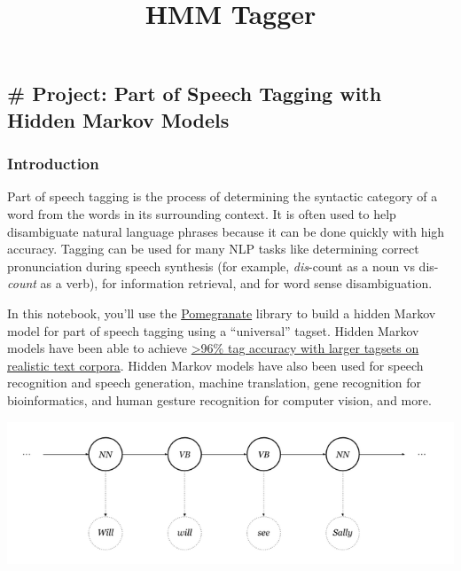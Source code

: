 \documentclass[11pt]{article}
\title{HMM Tagger}
\makeatletter
\def\maxwidth{\ifdim\Gin@nat@width>\linewidth\linewidth
    \else\Gin@nat@width\fi}
\let\Oldincludegraphics\includegraphics
\renewcommand{\includegraphics}[1]{\Oldincludegraphics[width=.8\maxwidth]{#1}}
\makeatother
\begin{document}
    
    
    \maketitle
    
    

    
    \hypertarget{project-part-of-speech-tagging-with-hidden-markov-models}{%
\subsection{\# Project: Part of Speech Tagging with Hidden Markov
Models}\label{project-part-of-speech-tagging-with-hidden-markov-models}}

\hypertarget{introduction}{%
\subsubsection{Introduction}\label{introduction}}

Part of speech tagging is the process of determining the syntactic
category of a word from the words in its surrounding context. It is
often used to help disambiguate natural language phrases because it can
be done quickly with high accuracy. Tagging can be used for many NLP
tasks like determining correct pronunciation during speech synthesis
(for example, \emph{dis}-count as a noun vs dis-\emph{count} as a verb),
for information retrieval, and for word sense disambiguation.

In this notebook, you'll use the
\href{http://pomegranate.readthedocs.io/}{Pomegranate} library to build
a hidden Markov model for part of speech tagging using a ``universal''
tagset. Hidden Markov models have been able to achieve
\href{http://www.coli.uni-saarland.de/~thorsten/publications/Brants-ANLP00.pdf}{\textgreater{}96\%
tag accuracy with larger tagsets on realistic text corpora}. Hidden
Markov models have also been used for speech recognition and speech
generation, machine translation, gene recognition for bioinformatics,
and human gesture recognition for computer vision, and more.

\includegraphics{_post-hmm.png}
\end{document}
